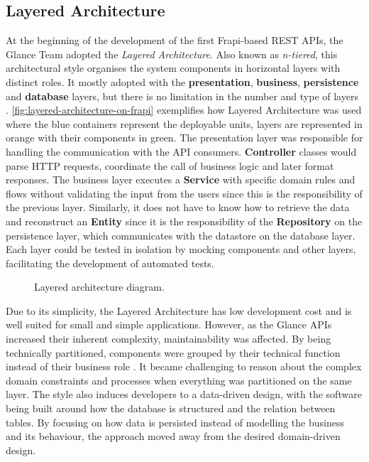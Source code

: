 \subsection{Layered Architecture}
\label{sec:layered-architecture}

At the beginning of the development of the first Frapi-based REST APIs, the Glance Team adopted the \textit{Layered Architecture}. Also known as \textit{n-tiered}, this architectural style organises the system components in horizontal layers with distinct roles. It mostly adopted with the \textbf{presentation}, \textbf{business}, \textbf{persistence} and \textbf{database} layers, but there is no limitation in the number and type of layers \cite{richards-architecture}. \autoref{fig:layered-architecture-on-frapi} exemplifies how Layered Architecture was used where the blue containers represent the deployable units, layers are represented in orange with their components in green. The presentation layer was responsible for handling the communication with the API consumers. \textbf{Controller} classes would parse HTTP requests, coordinate the call of business logic and later format responses. The business layer executes a \textbf{Service} with specific domain rules and flows without validating the input from the users since this is the responsibility of the previous layer. Similarly, it does not have to know how to retrieve the data and reconstruct an \textbf{Entity} since it is the responsibility of the \textbf{Repository} on the persistence layer, which communicates with the datastore on the database layer. Each layer could be tested in isolation by mocking components and other layers, facilitating the development of automated tests.

\begin{figure}[htbp]
  \centering
  
  \caption{Layered architecture diagram.}
  \label{fig:layered-architecture-on-frapi}
\end{figure}

Due to its simplicity, the Layered Architecture has low development cost and is well suited for small and simple applications. However, as the Glance APIs increased their inherent complexity, maintainability was affected. By being technically partitioned, components were grouped by their technical function instead of their business role \cite{richards-architecture}. It became challenging to reason about the complex domain constraints and processes when everything was partitioned on the same layer. The style also induces developers to a data-driven design, with the software being built around how the database is structured and the relation between tables. By focusing on how data is persisted instead of modelling the business and its behaviour, the approach moved away from the desired domain-driven design.

